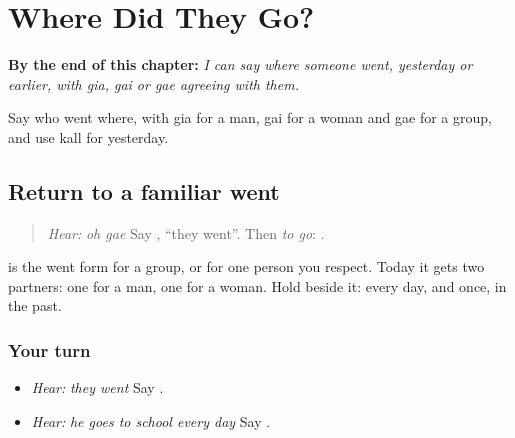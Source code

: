
\chapter{Where Did They Go?}
\label{ch:pa-a2-gia}

\begin{chapteropening}
\textbf{By the end of this chapter:} \emph{I can say where someone went, yesterday or earlier, with gia, gai or gae agreeing with them.}

Say who went where, with gia for a man, gai for a woman and gae for a group, and use kall for yesterday.
\end{chapteropening}

\section[\texorpdfstring{\pa{ਉਹ} \pa{ਗਏ} (uh gae)}{ਉਹ ਗਏ (uh gae)}]{Return to a familiar went}

\label{lesson:PA-C216-gae-return}



\begin{quote}
\emph{Hear:} \emph{oh gae} Say \textbf{ }, \textquotedblleft{}they went\textquotedblright{}. Then \emph{to go}: \textbf{}.
\end{quote}

\begin{grammarlens}[title={Grammar Lens}]
\textbf{} is the went form for a group, or for one person you respect. Today it gets two partners: one for a man, one for a woman. Hold \textbf{    } beside it: every day, and once, in the past.
\end{grammarlens}

\subsection*{Your turn}
\begin{itemize}
\raggedright
  \item \emph{Hear:} \emph{they went} Say \textbf{ }.
  \item \emph{Hear:} \emph{he goes to school every day} Say \textbf{    }.
\end{itemize}

